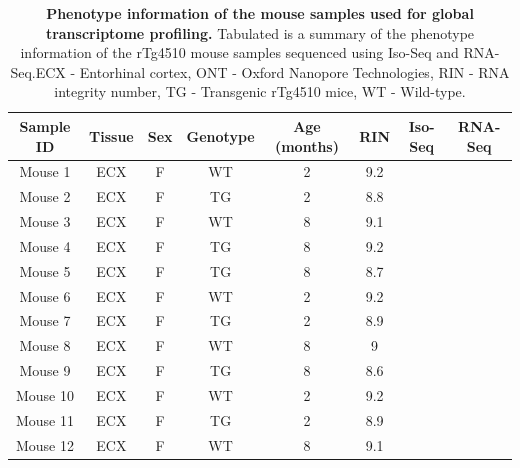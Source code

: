 \vspace{1cm}
\begin{table}[h]
    \setlength\tabcolsep{7pt} %
	\captionsetup{width=0.95\textwidth}
	\caption[Phenotype information of the mouse samples used for global transcriptome profiling]%
	{\textbf{Phenotype information of the mouse samples used for global transcriptome profiling.} Tabulated is a summary of the phenotype information of the rTg4510 mouse samples sequenced using Iso-Seq and RNA-Seq.\newline ECX - Entorhinal cortex, ONT - Oxford Nanopore Technologies, RIN - RNA integrity number, TG - Transgenic rTg4510 mice, WT - Wild-type.}
	\label{tab:whole_phenotype}
	\centering
	\begin{tabular}{@{}cccccccc@{}}
		\toprule
		Sample ID & Tissue & Sex & Genotype & Age (months) & RIN & Iso-Seq & RNA-Seq  \\ \midrule
		Mouse 1   & ECX    & F   & WT       & 2         & 9.2 & \checkmark       &  \checkmark         \\
		Mouse 2   & ECX    & F   & TG       & 2         & 8.8 & \checkmark        & \checkmark        \\
		Mouse 3   & ECX    & F   & WT       & 8         & 9.1 & \checkmark        & \checkmark        \\
		Mouse 4   & ECX    & F   & TG       & 8         & 9.2 & \checkmark        & \checkmark        \\
		Mouse 5   & ECX    & F   & TG       & 8         & 8.7 & \checkmark        & \checkmark        \\
		Mouse 6   & ECX    & F   & WT       & 2         & 9.2 & \checkmark        & \checkmark        \\
		Mouse 7   & ECX    & F   & TG       & 2         & 8.9 & \checkmark        & \checkmark        \\
		Mouse 8   & ECX    & F   & WT       & 8         & 9   & \checkmark        & \checkmark       \\
		Mouse 9   & ECX    & F   & TG       & 8         & 8.6 & \checkmark        & \checkmark        \\
		Mouse 10  & ECX    & F   & WT       & 2         & 9.2 & \checkmark        & \checkmark        \\
		Mouse 11  & ECX    & F   & TG       & 2         & 8.9 & \checkmark        & \checkmark       \\
		Mouse 12  & ECX    & F   & WT       & 8         & 9.1 & \checkmark        & \checkmark        \\ \bottomrule
	\end{tabular}
\end{table}

